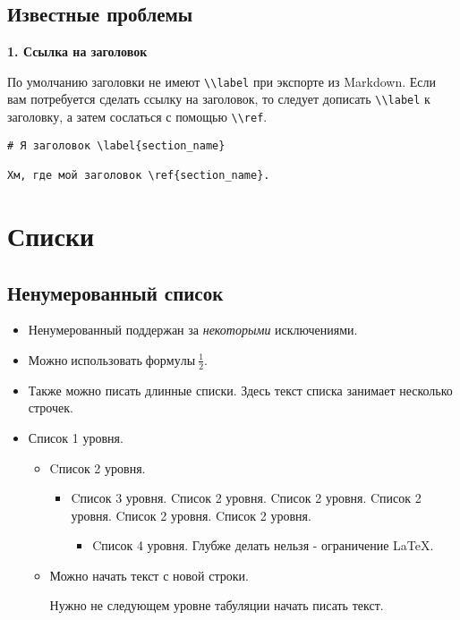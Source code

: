 \documentclass[a4paper]{article}
\renewcommand{\emph}[1]{\textit{#1}}
\def\tightlist{}
\newcommand{\passthrough}[1]{{\codefont #1}}
\begin{document}
\subsection{Известные
проблемы}\label{ux438ux437ux432ux435ux441ux442ux43dux44bux435-ux43fux440ux43eux431ux43bux435ux43cux44b-1}

\textbf{1. Ссылка на заголовок}

По умолчанию заголовки не имеют \passthrough{\lstinline!\\label!} при
экспорте из Markdown. Если вам потребуется сделать ссылку на заголовок,
то следует дописать \passthrough{\lstinline!\\label!} к заголовку, а
затем сослаться с помощью \passthrough{\lstinline!\\ref!}.

\begin{lstlisting}
# Я заголовок \label{section_name}

Хм, где мой заголовок \ref{section_name}.
\end{lstlisting}

\section{Списки}\label{ux441ux43fux438ux441ux43aux438}

\subsection{Ненумерованный
список}\label{ux43dux435ux43dux443ux43cux435ux440ux43eux432ux430ux43dux43dux44bux439-ux441ux43fux438ux441ux43eux43a}

\begin{itemize}
\item
  Ненумерованный поддержан за \emph{некоторыми} исключениями.
\item
  \(\mathit{Можно}\;\mathit{использовать}\;\mathit{формулы}\:\frac{1}{2}\).
\item
  Также можно писать длинные списки. Здесь текст списка занимает
  несколько строчек.
\item
  Список 1 уровня.

  \begin{itemize}
  \item
    Cписок 2 уровня.

    \begin{itemize}
    \tightlist
    \item
      Cписок 3 уровня. Cписок 2 уровня. Cписок 2 уровня. Cписок 2
      уровня. Cписок 2 уровня. Cписок 2 уровня.

      \begin{itemize}
      \tightlist
      \item
        Cписок 4 уровня. Глубже делать нельзя - ограничение LaTeX.
      \end{itemize}
    \end{itemize}
  \item
    Можно начать текст с новой строки.

    Нужно не следующем уровне табуляции начать писать текст.
  \end{itemize}
\end{itemize}
\end{document}
